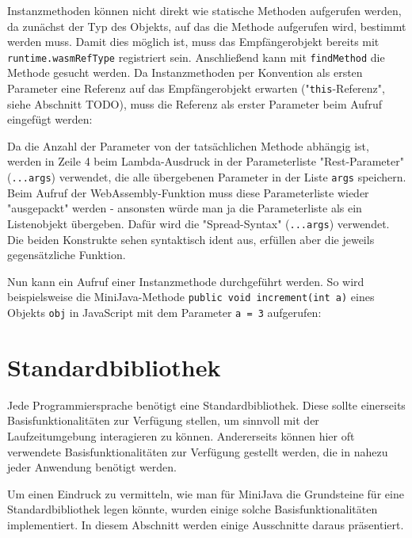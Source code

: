 Instanzmethoden können nicht direkt wie statische Methoden aufgerufen werden, da zunächst der Typ des Objekts, auf das die Methode aufgerufen wird, bestimmt werden muss. Damit dies möglich ist, muss das Empfängerobjekt bereits mit \lstinline{runtime.wasmRefType} registriert sein. Anschließend kann mit \lstinline{findMethod} die Methode gesucht werden. Da Instanzmethoden per Konvention als ersten Parameter eine Referenz auf das Empfängerobjekt erwarten ("\lstinline{this}-Referenz", siehe Abschnitt TODO), muss die Referenz als erster Parameter beim Aufruf eingefügt werden:



Da die Anzahl der Parameter von der tatsächlichen Methode abhängig ist, werden in Zeile 4 beim Lambda-Ausdruck in der Parameterliste "Rest-Parameter" (\lstinline{...args}) \cite{MDNJavaScript} verwendet, die alle übergebenen Parameter in der Liste \lstinline{args} speichern. Beim Aufruf der WebAssembly-Funktion muss diese Parameterliste wieder "ausgepackt" werden - ansonsten würde man ja die Parameterliste als ein Listenobjekt übergeben. Dafür wird die "Spread-Syntax" (\lstinline{...args}) verwendet. Die beiden Konstrukte sehen syntaktisch ident aus, erfüllen aber die jeweils gegensätzliche Funktion.

Nun kann ein Aufruf einer Instanzmethode durchgeführt werden. So wird beispielsweise die MiniJava-Methode \lstinline{public void increment(int a)} eines Objekts \lstinline{obj} in JavaScript mit dem Parameter \lstinline{a = 3} aufgerufen:



\section{Standardbibliothek}

Jede Programmiersprache benötigt eine Standardbibliothek. Diese sollte einerseits Basisfunktionalitäten zur Verfügung stellen, um sinnvoll mit der Laufzeitumgebung interagieren zu können. Andererseits können hier oft verwendete Basisfunktionalitäten zur Verfügung gestellt werden, die in nahezu jeder Anwendung benötigt werden.

Um einen Eindruck zu vermitteln, wie man für MiniJava die Grundsteine für eine Standardbibliothek legen könnte, wurden einige solche Basisfunktionalitäten implementiert. In diesem Abschnitt werden einige Ausschnitte daraus präsentiert.


